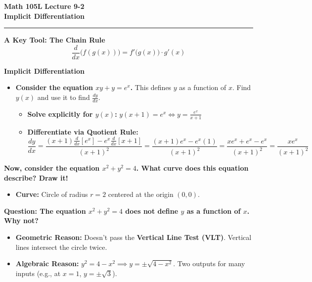 \documentclass[10.5pt]{article}
\begin{document}
\noindent \textbf{\large Math 105L} \hfill \textbf{\large Lecture 9-2}\\[1pt]
{\textbf{\Large Implicit Differentiation}}\\[-5pt]
\rule{\textwidth}{1.2pt}

\vspace{0.03in}

\textbf{\large A Key Tool: The Chain Rule}
\vspace{-4pt}
\[
  \frac{d}{dx}\big(f(g(x))\big) = f'\big(g(x)\big) \cdot g'(x)
\]

\vspace{0.02in}

\textbf{\large Implicit Differentiation}

\begin{itemize}[leftmargin=1.2em, topsep=1pt, itemsep=1pt]
  \item \textbf{Consider the equation $xy + y = e^x$.} This defines $y$ as a function of $x$. Find $y(x)$ and use it to find $\frac{dy}{dx}$.
  \begin{itemize}[leftmargin=1.2em, label=$\bullet$, topsep=1pt, itemsep=1pt]
    \item \textbf{Solve explicitly for $y(x)$:} \quad $y(x+1) = e^x \iff y = \frac{e^x}{x+1}$
    \item \textbf{Differentiate via Quotient Rule:}
    \[
      \frac{dy}{dx} = \frac{(x+1)\frac{d}{dx}[e^x] - e^x \frac{d}{dx}[x+1]}{(x+1)^2} = \frac{(x+1)e^x - e^x(1)}{(x+1)^2} = \frac{xe^x + e^x - e^x}{(x+1)^2} = \frac{xe^x}{(x+1)^2}
    \]
  \end{itemize}
\end{itemize}

\vspace{0.03in}
\textbf{Now, consider the equation $x^2 + y^2 = 4$. What curve does this equation describe? Draw it!}
\begin{itemize}[leftmargin=1.2em, label=$\bullet$, topsep=0pt, itemsep=1pt]
  \item \textbf{Curve:} Circle of radius $r = 2$ centered at the origin $(0,0)$.
\end{itemize}

\textbf{Question: The equation $x^2 + y^2 = 4$ does not define $y$ as a function of $x$. Why not?}
\begin{itemize}[leftmargin=1.2em, label=$\bullet$, topsep=0pt, itemsep=1pt]
  \item \textbf{Geometric Reason:} Doesn't pass the \textbf{Vertical Line Test (VLT)}. Vertical lines intersect the circle twice.
  \item \textbf{Algebraic Reason:} $y^2 = 4 - x^2 \implies y = \pm\sqrt{4 - x^2}$. Two outputs for many inputs (e.g., at $x=1$, $y = \pm\sqrt{3}$).
\end{itemize}
\end{document}
